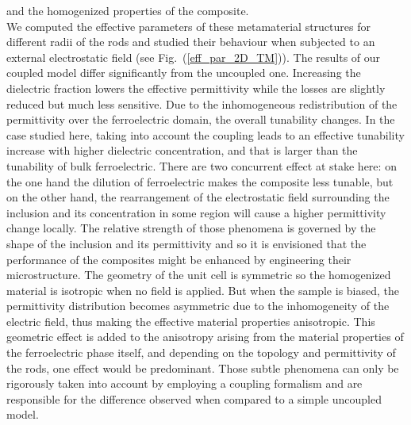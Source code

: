 \documentclass[openacc]{rsproca_new}%
\newcommand{\fig}[1]{Fig.~(\ref{#1})}
\begin{document}
 and the homogenized properties of the composite.\\
 We computed the effective parameters of these metamaterial structures for different
 radii of the rods and studied their behaviour when subjected to an external
 electrostatic field (see \fig{eff_par_2D_TM}). The results of our coupled
 model differ significantly from the uncoupled one. Increasing the dielectric fraction
 lowers the effective permittivity while the losses are slightly reduced but much less sensitive.
 Due to the inhomogeneous redistribution of the permittivity over the ferroelectric domain, the
 overall tunability changes. In the case studied here, taking into account the coupling leads to an effective tunability increase with
 higher dielectric concentration, and that is larger than the tunability of bulk ferroelectric.  There are two concurrent effect at stake here: on the one hand
 the dilution of ferroelectric makes the composite less tunable, but on the other hand,
 the rearrangement of the electrostatic field surrounding the inclusion and its
 concentration in some region will cause a higher permittivity change locally.
 The relative strength of those phenomena is governed by the shape of the inclusion and its permittivity
 and so it is envisioned that the performance of the composites might be enhanced by engineering
 their microstructure.
 The geometry of the unit cell is symmetric so the homogenized material is
  isotropic when no field is applied.
 But when the sample is biased, the permittivity distribution becomes asymmetric due
 to the inhomogeneity of the electric field, thus making the effective material properties anisotropic.
This geometric effect is added to the anisotropy arising from the material properties of the ferroelectric
phase itself, and depending on the topology and permittivity of the rods, one effect would be predominant.
Those subtle phenomena can only be rigorously taken into account by employing a coupling formalism
and are responsible for the difference observed when compared to a simple uncoupled model.\\
\end{document}
